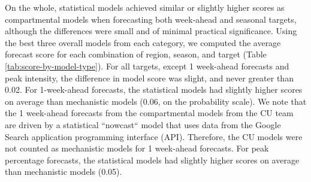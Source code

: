 \documentclass[9pt,twocolumn,twoside]{pnas-new}\usepackage[]{graphicx}\usepackage[]{color}
\begin{document}
On the whole, statistical models achieved similar or slightly higher scores as compartmental models when forecasting both week-ahead and seasonal targets, although the differences were small and of minimal practical significance. 
Using the best three overall models from each category, we computed the average forecast score for each combination of region, season, and target (Table \ref{tab:score-by-model-type}). 
For all targets, except 1 week-ahead forecasts and peak intensity, the difference in model score was slight, and never greater than 
0.02.
For 1-week-ahead forecasts, the statistical models had slightly higher scores on average than mechanistic models  
(0.06, on the probability scale). 
We note that the 1 week-ahead forecasts from the compartmental models from the CU team are driven by a statistical ``nowcast`` model that uses data from the Google Search application programming interface (API).\cite{Kandula2017}
Therefore, the CU models were not counted as mechanistic models for 1 week-ahead forecasts.
For peak percentage forecasts, the statistical models had slightly higher scores on average than mechanistic models  
(0.05). 




% 


\end{document}
